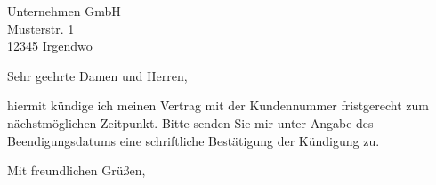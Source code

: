 \documentclass[
    absender,
    visualize,
    paper=a4,
    version=last,
    fontsize=11pt,
    DIV=13,
    BCOR=0mm]{scrlttr2}
\begin{document}
\makeatletter{}\makeatother




\begin{letter}{
    Unternehmen GmbH\\
    Musterstr. 1\\
    12345 Irgendwo
}
\opening{Sehr geehrte Damen und Herren,}

hiermit kündige ich meinen Vertrag mit der Kundennummer \customer{} fristgerecht zum nächstmöglichen Zeitpunkt.
Bitte senden Sie mir unter Angabe des Beendigungsdatums eine schriftliche Bestätigung der Kündigung zu.

\closing{Mit freundlichen Grüßen,}
\end{letter}
\end{document}
